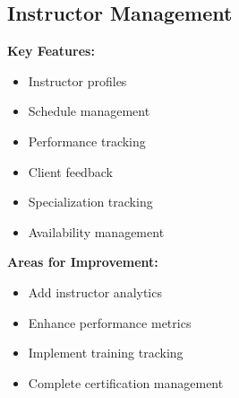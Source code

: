 \subsection{Instructor Management}
\begin{tcolorbox}[
    enhanced,
    title={Instructor Management: 80\% Complete},
    attach boxed title to top left,
    boxed title style={
        colback=success!50,
        colframe=success!50,
        arc=0mm,
    },
    colback=white,
    colframe=success!50,
    arc=0mm,
    fonttitle=\bfseries
]
    \textbf{Key Features:}
    \begin{itemize}
        \item Instructor profiles
        \item Schedule management
        \item Performance tracking
        \item Client feedback
        \item Specialization tracking
        \item Availability management
    \end{itemize}
    
    \textbf{Areas for Improvement:}
    \begin{itemize}
        \item Add instructor analytics
        \item Enhance performance metrics
        \item Implement training tracking
        \item Complete certification management
    \end{itemize}
\end{tcolorbox}

